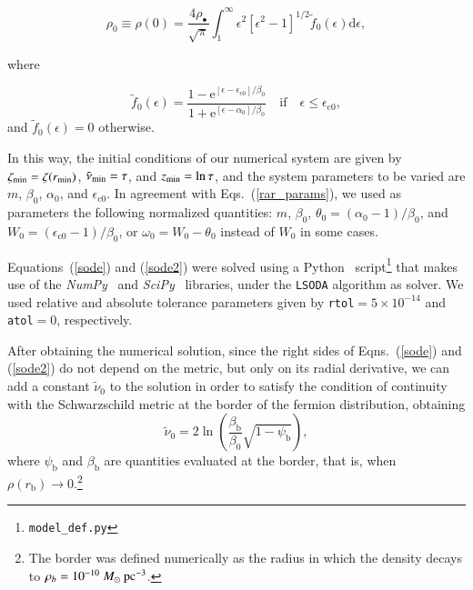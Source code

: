 \documentclass[referee]{aa} %
\begin{document}
\begin{appendix}
\begin{equation}
    \rho_0\equiv \rho(0) = \frac{4\rho_{\bullet}}{\sqrt{\pi}}\int^\infty_1\epsilon^2[\epsilon^2-1]^{1/2}\tilde{f}_0(\epsilon)\mathrm{d}\epsilon,
\end{equation}

where

\begin{equation}
\tilde{f}_0(\epsilon)=
      \frac{1-\mathrm {e}^{[\epsilon-\epsilon_\mathrm{c0}]/\beta_0}}
      {1+\mathrm {e}^{[\epsilon-\alpha_0]/\beta_0}}\quad\mathrm{if}\quad \epsilon \leq \epsilon_\mathrm{c0},
\end{equation}
and $\tilde{f}_0(\epsilon)=0$ otherwise.

In this way, the initial conditions of our numerical system are given
by $\zeta_{\rm{min}}=\zeta(r_{\rm{min}})$,
$\tilde{\nu}_{\rm{min}}=\tau$, and $z_{\rm{min}}=\ln{\tau}$, and the system parameters to be varied are $m$, $\beta_0$, $\alpha_0$, and $\epsilon_{c0}$.
In agreement with Eqs.~(\ref{rar_params}), we used as parameters the following normalized quantities: $m$, $\beta_0$, $\theta_0=(\alpha_0-1)/\beta_0$, and $W_0=(\epsilon_{\mathrm{c}0}-1)/\beta_0$, or $\omega_0=W_0-\theta_0$ instead of $W_0$ in some cases.

Equations~(\ref{sode}) and (\ref{sode2}) were solved using
a {\sc Python}~\citep{van1995python} script\footnote{\texttt{model\_def.py}}
that makes use of the {\it NumPy}~\citep{2020SciPy-NMeth} and {\it SciPy}~\citep{harris2020array} libraries, under the \texttt{LSODA} algorithm as solver.  We used relative and absolute tolerance parameters given by \texttt{rtol}$=5\times10^{-14}$ and \texttt{atol}$=0$, respectively.

After obtaining the numerical solution, since the right sides of Eqns.~(\ref{sode}) and (\ref{sode2}) do not depend on the metric, but only on its radial derivative, we can add
a constant $\tilde{\nu}_0$ to the solution in order to satisfy the condition of continuity with the Schwarzschild metric at the border of the fermion distribution, obtaining
\begin{equation}
\tilde{\nu}_0 = 2\ln\left(\frac{\beta_\mathrm{b}}{\beta_0}\sqrt{1-\psi_\mathrm{b}}\right),
\end{equation}
where $\psi_\mathrm{b}$ and $\beta_\mathrm{b}$ are quantities evaluated at the border, that is, when
$\rho(r_\mathrm{b})\rightarrow 0$.\footnote{The border was defined numerically as the radius in which
the density decays to $\rho_b=10^{-10}~M_\odot~\rm{pc}^{-3}$.}


\end{appendix}
\end{document}

